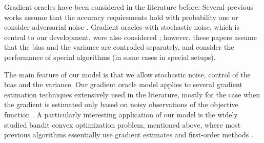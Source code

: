 Gradient oracles have been considered in the literature before: Several previous works assume that the accuracy requirements hold with probability one \citep{dAsp08,Baes09,DeGliNe14} or consider adversarial noise \citep{SchRoBa11}. Gradient oracles with stochastic noise, which is central to our development, were also considered \citep{JN11a,Hon12,DvoGa15}; however, these papers assume that the bias and the variance are controlled separately, and consider the performance of special algorithms (in some cases in special setups).

The main feature of our model is that we allow stochastic noise, control of the bias and the variance. Our gradient oracle model applies to several gradient estimation techniques extensively used in the literature, mostly for the case when the gradient is estimated only based on noisy observations of the objective function \citep{katkul,kushcla,spall1992multivariate,spall1997one,Dip03:AoS,bhatnagar-book,duchi2015optimal}. A particularly interesting application of our model is the widely studied bandit convex optimization problem,
mentioned above,
where most previous algorithms 
essentially use gradient estimates and first-order methods 
\citep{PoTsy90,flaxman2005online,AbHaRa08,AgDeXi10,Ne11:TR,AgFoHsuKaRa13:SIAM,HaLe14:SOC}.


